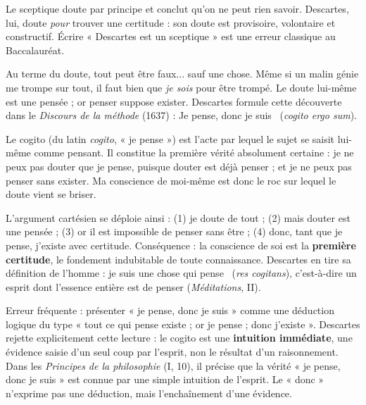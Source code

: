 \documentclass[11pt]{article}
\newcommand{\cle}[1]{{\popxbold\color{popdark}#1}}
\newcounter{popsec}
\newcounter{popsub}
\newcommand{\courssub}[1]{%
  \stepcounter{popsub}%
  \par\vspace{9pt}\noindent{\popxbold\fontsize{11.5}{13}\selectfont\color{popink}{\color{poporange}\thepopsec.\thepopsub}\hspace{6pt}#1}\par\nopagebreak\vspace{4pt}
}
\begin{document}
\begin{attention}
Le sceptique doute par principe et conclut qu'on ne peut rien savoir. Descartes, lui, doute \emph{pour} trouver une certitude : son doute est provisoire, volontaire et constructif. Écrire « Descartes est un sceptique » est une erreur classique au Baccalauréat.
\end{attention}

\courssub{Le cogito : la première certitude}

Au terme du doute, tout peut être faux... sauf une chose. Même si un malin génie me trompe sur tout, il faut bien que \emph{je sois} pour être trompé. Le doute lui-même est une pensée ; or penser suppose exister. Descartes formule cette découverte dans le \emph{Discours de la méthode} (1637) : \guillemotleft Je pense, donc je suis \guillemotright\ (\emph{cogito ergo sum}).

\begin{definition}[Le cogito]
Le \cle{cogito} (du latin \emph{cogito}, « je pense ») est l'acte par lequel le sujet se saisit lui-même comme pensant. Il constitue la première vérité absolument certaine : je ne peux pas douter que je pense, puisque douter est déjà penser ; et je ne peux pas penser sans exister. Ma conscience de moi-même est donc le roc sur lequel le doute vient se briser.
\end{definition}

\begin{propriete}
L'argument cartésien se déploie ainsi : (1) je doute de tout ; (2) mais douter est une pensée ; (3) or il est impossible de penser sans être ; (4) donc, tant que je pense, j'existe avec certitude. Conséquence : la conscience de soi est la \textbf{première certitude}, le fondement indubitable de toute connaissance. Descartes en tire sa définition de l'homme : je suis \guillemotleft une chose qui pense \guillemotright\ (\emph{res cogitans}), c'est-à-dire un esprit dont l'essence entière est de penser (\emph{Méditations}, II).
\end{propriete}

\begin{attention}
Erreur fréquente : présenter « je pense, donc je suis » comme une déduction logique du type « tout ce qui pense existe ; or je pense ; donc j'existe ». Descartes rejette explicitement cette lecture : le cogito est une \textbf{intuition immédiate}, une évidence saisie d'un seul coup par l'esprit, non le résultat d'un raisonnement. Dans les \emph{Principes de la philosophie} (I, 10), il précise que la vérité « je pense, donc je suis » est connue par une simple intuition de l'esprit. Le « donc » n'exprime pas une déduction, mais l'enchaînement d'une évidence.
\end{attention}
\end{document}
